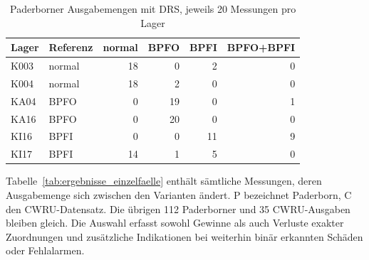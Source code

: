 
\begin{table}[H]
  \centering
  \caption{Paderborner Ausgabemengen mit DRS, jeweils 20 Messungen pro Lager}
  \label{tab:ergebnisse_paderborn_lager}
  \small
  \begin{tabular}{llrrrr}
    \hline
    \textbf{Lager} & \textbf{Referenz} & normal & BPFO & BPFI & BPFO+BPFI \\
    \hline
    K003 & normal & 18 & 0 & 2 & 0 \\
    K004 & normal & 18 & 2 & 0 & 0 \\
    KA04 & BPFO & 0 & 19 & 0 & 1 \\
    KA16 & BPFO & 0 & 20 & 0 & 0 \\
    KI16 & BPFI & 0 & 0 & 11 & 9 \\
    KI17 & BPFI & 14 & 1 & 5 & 0 \\
    \hline
  \end{tabular}
\end{table}

\clearpage
{}

Tabelle~\ref{tab:ergebnisse_einzelfaelle} enthält sämtliche Messungen,
deren Ausgabemenge sich zwischen den Varianten ändert. P bezeichnet
Paderborn, C den CWRU-Datensatz. Die übrigen 112 Paderborner und 35
CWRU-Ausgaben bleiben gleich. Die Auswahl erfasst sowohl Gewinne als auch
Verluste exakter Zuordnungen und zusätzliche Indikationen bei weiterhin
binär erkannten Schäden oder Fehlalarmen.

